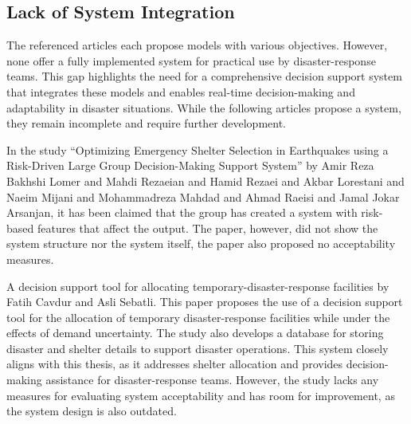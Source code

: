 \subsection{Lack of System Integration}

The referenced articles each propose models with various objectives. However, none offer a fully implemented system for practical use by disaster-response teams. This gap highlights the need for a comprehensive decision support system that integrates these models and enables real-time decision-making and adaptability in disaster situations. While the following articles propose a system, they remain incomplete and require further development.

In the study “Optimizing Emergency Shelter Selection in Earthquakes using a Risk-Driven Large Group Decision-Making Support System” by Amir Reza Bakhshi Lomer and Mahdi Rezaeian and Hamid Rezaei and Akbar Lorestani and Naeim Mijani and Mohammadreza Mahdad and Ahmad Raeisi and Jamal Jokar Arsanjan, it has been claimed that the group has created a system with risk-based features that affect the output. The paper, however, did not show the system structure nor the system itself, the paper also proposed no acceptability measures. \parencite{Amir2023}

A decision support tool for allocating temporary-disaster-response facilities by Fatih Cavdur and Asli Sebatli. This paper proposes the use of a decision support tool for the allocation of temporary disaster-response facilities while under the effects of demand uncertainty. The study also develops a database for storing disaster and shelter details to support disaster operations. This system closely aligns with this thesis, as it addresses shelter allocation and provides decision-making assistance for disaster-response teams. However, the study lacks any measures for evaluating system acceptability and has room for improvement, as the system design is also outdated. \parencite{Cavdur2019}

